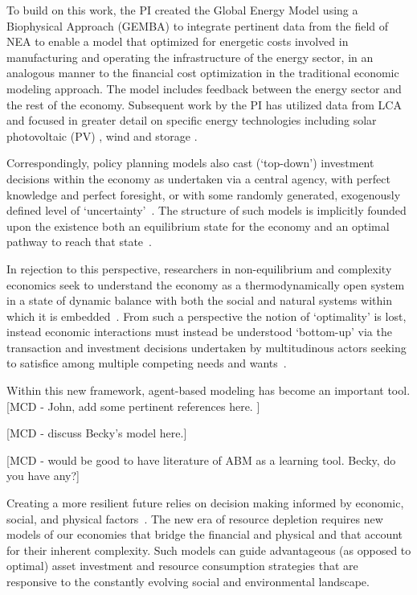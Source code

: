 \documentclass[11pt,a4paper]{article}
\begin{document}
To build on this work, the PI created 
the Global Energy Model using a Biophysical Approach (GEMBA) 
to integrate pertinent data from the field of NEA 
to enable a model that optimized for energetic costs involved in 
manufacturing and operating the infrastructure of the energy sector, 
in an analogous manner to the financial cost optimization 
in the traditional economic modeling approach. 
The model includes feedback between the energy sector 
and the rest of the economy. 
Subsequent work by the PI has utilized data from LCA 
and focused in greater detail on specific energy technologies 
including solar photovoltaic (PV) , wind and storage . 

Correspondingly,
policy planning models also cast (`top-down') investment decisions 
within the economy as undertaken via a central agency,
with perfect knowledge and perfect foresight, 
or with some randomly generated, 
exogenously defined level of `uncertainty'~\cite{Hu2010}.
The structure of such models
is implicitly founded upon the existence both 
an equilibrium state for the economy
and an optimal pathway to reach that state~\cite{}.

In rejection to this perspective,
researchers in non-equilibrium and complexity economics
seek to understand the economy as a 
thermodynamically open system in a state of dynamic balance
with both the social and natural systems within which it is embedded~\cite{}.
From such a perspective the notion of `optimality' is lost,
instead economic interactions must instead be understood
`bottom-up' via the transaction and investment decisions
undertaken by multitudinous actors seeking to 
satisfice among multiple competing needs and wants~\cite{}.

Within this new framework,
agent-based modeling has become an important tool.
[MCD - John, add some pertinent references here. ]

[MCD - discuss Becky's model here.]

[MCD - would be good to have literature of ABM as a learning tool. 
Becky, do you have any?]

Creating a more resilient future
relies on decision making informed by 
economic, 
social,
and physical factors~\cite{Heun2015}.
The new era of resource depletion requires
new models of our economies that bridge the financial and physical
and that account for their inherent complexity.
Such models can guide advantageous (as opposed to optimal)
asset investment and resource consumption strategies
that are responsive to the constantly evolving 
social and environmental landscape.
\end{document}
